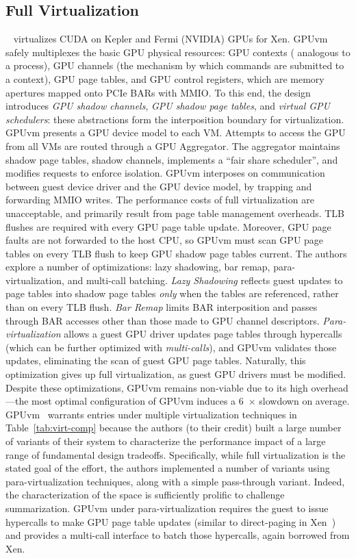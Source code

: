 

\subsection{Full Virtualization}

~\cite{suzuki2014gpuvm} virtualizes CUDA on Kepler and
Fermi (NVIDIA) GPUs for Xen.
GPUvm safely multiplexes the basic GPU physical resources: GPU contexts (
analogous to a process), GPU channels (the mechanism by which commands are
submitted to a context), GPU page tables, and GPU control registers, which are
memory apertures mapped onto PCIe BARs with MMIO. To this end, the design introduces \emph{GPU shadow channels}, \emph{GPU shadow page tables}, and \emph{virtual GPU schedulers}: these abstractions form the interposition boundary for virtualization.
GPUvm presents a GPU device model to each VM.
Attempts to access the GPU from all VMs are routed through a GPU Aggregator.
The aggregator maintains shadow page tables, shadow channels, implements a
``fair share scheduler'', and modifies requests to enforce isolation. GPUvm
interposes on communication between guest device driver and the GPU device
model, by trapping and forwarding MMIO writes. The performance costs of full
virtualization are unacceptable, and primarily result from page table
management overheads. TLB flushes are required with every GPU page table
update. Moreover, GPU page faults are not forwarded to the host CPU, so GPUvm
must scan GPU page tables on every TLB flush to keep GPU shadow page tables
current. The authors explore a number of optimizations: lazy shadowing, bar
remap, para-virtualization, and multi-call batching. \emph{Lazy Shadowing}
reflects guest updates to page tables into shadow page tables \emph{only} when
the tables are referenced, rather than on every TLB flush. \emph{Bar Remap}
limits BAR interposition and passes through BAR accesses other than those made
to GPU channel descriptors. \emph{Para-virtualization} allows a guest GPU
driver updates page tables through hypercalls (which can be further optimized
with \emph{multi-calls}), and GPUvm validates those updates, eliminating the
scan of guest GPU page tables. Naturally, this optimization gives up full
virtualization, as guest GPU drivers must be modified. Despite these
optimizations, GPUvm remains non-viable due to its high overhead---the most
optimal configuration of GPUvm induces a 6~$\times$ slowdown on average.
GPUvm~\cite{GPUvm} warrants entries under multiple virtualization techniques
in Table~\ref{tab:virt-comp} because the authors (to their credit) built a
large number of variants of their system to characterize the performance
impact of a large range of fundamental design tradeoffs. Specifically, while
full virtualization is the stated goal of the effort, the authors implemented
a number of variants using para-virtualization techniques, along with a simple
pass-through variant. Indeed, the characterization of the space is
sufficiently prolific to challenge summarization.
GPUvm under para-virtualization requires the guest to issue hypercalls to make
GPU page table updates (similar to direct-paging in Xen~\cite{xen}) and
provides a multi-call interface to batch those hypercalls, again borrowed from
Xen.


